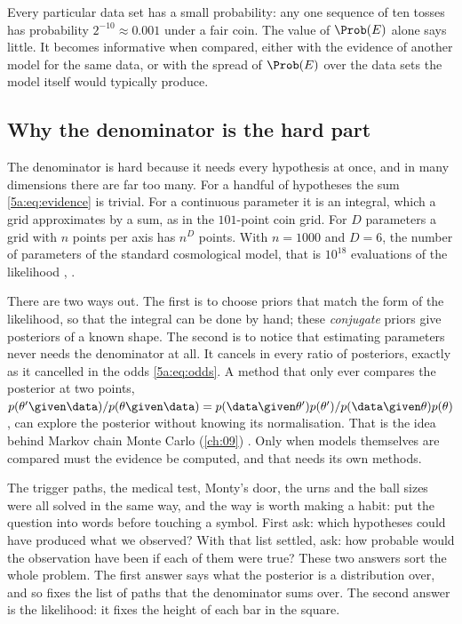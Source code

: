 \begin{pitfall}
Every particular data set has a small probability: any one sequence of ten tosses has
probability $2^{-10}\approx0.001$ under a fair coin. The value of $\Prob(E)$ alone says
little. It becomes informative when compared, either with the evidence of another
model for the same data, or with the spread of $\Prob(E)$ over the data sets the model
itself would typically produce.
\end{pitfall}

\subsection{Why the denominator is the hard part}

The denominator is hard because it needs every hypothesis at once, and in many
dimensions there are far too many. For a handful of hypotheses the sum
\eqref{5a:eq:evidence} is trivial. For a continuous parameter it is an integral,
which a grid approximates by a sum, as in the $101$-point coin grid. For $D$
parameters a grid with $n$ points per axis has $n^D$ points. With $n=1000$ and
$D=6$, the number of parameters of the standard cosmological model, that is
$10^{18}$ evaluations of the likelihood ,
.

There are two ways out. The first is to choose priors that match the form of the
likelihood, so that the integral can be done by hand; these \emph{conjugate}
priors give posteriors of a known shape. The second is to notice that estimating
parameters never needs the denominator at all. It cancels in every ratio of
posteriors, exactly as it cancelled in the odds \eqref{5a:eq:odds}. A method that
only ever compares the posterior at two points,
$p(\theta'\given\data)/p(\theta\given\data)=p(\data\given\theta')p(\theta')/p(\data\given\theta)p(\theta)$,
can explore the posterior without knowing its normalisation. That is the idea behind
Markov chain Monte Carlo (\cref{ch:09}) . Only when models
themselves are compared must the evidence be computed, and that needs its own methods.

The trigger paths, the medical test, Monty's door, the urns and the ball sizes
were all solved in the same way, and the way is worth making a habit: put the
question into words before touching a symbol. First ask: which hypotheses could
have produced what we observed? With that list settled, ask: how probable would
the observation have been if each of them were true? These two answers sort the
whole problem. The first answer says what the posterior is a distribution over,
and so fixes the list of paths that the denominator sums over. The second answer
is the likelihood: it fixes the height of each bar in the square.

